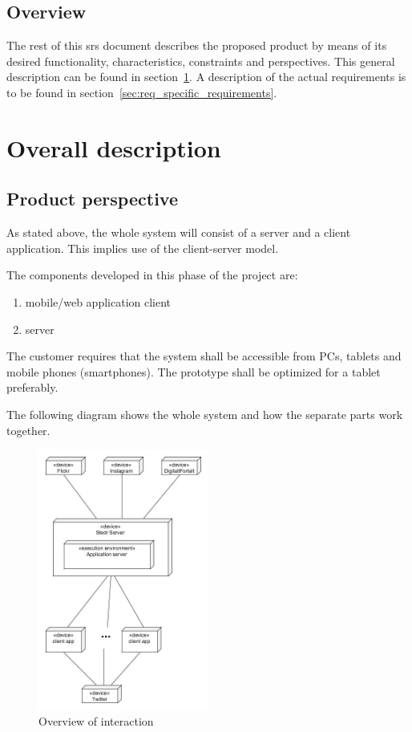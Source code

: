 \documentclass[11pt]{book}
\begin{document}
\subsection{Overview}
The rest of this \gls{srs} document describes the proposed product by means of its desired functionality, characteristics, constraints and perspectives. This general description can be found in section~\ref{sec:req_overall_description}. A description of the actual requirements is to be found in section~\ref{sec:req_specific_requirements}.

\section{Overall description}\label{sec:req_overall_description}
\subsection{Product perspective}
As stated above, the whole system will consist of a server and a client application. This implies use of the client-server model.

The components developed in this phase of the project are:

\begin{enumerate}
  \item mobile/web application client
  \item server
\end{enumerate}

The customer requires that the system shall be accessible from PCs, tablets and mobile phones (smartphones). The prototype shall be optimized for a tablet preferably.

The following diagram shows the whole system and how the separate parts work together.

\begin{figure}[H]
      \centering
      \includegraphics[width=0.5\textwidth]{Figures/Architecture/deploymentView.jpg}
      \caption{Overview of interaction}
      \label{fig:req_overview}
\end{figure}
\end{document}

